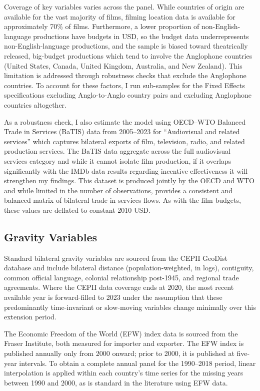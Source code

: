 Coverage of key variables varies across the panel. While countries of origin are available for the vast majority of films, filming location data is available for approximately 70\% of films. Furthermore, a lower proportion of non-English-language productions have budgets in USD, so the budget data underrepresents non-English-language productions, and the sample is biased toward theatrically released, big-budget productions which tend to involve the Anglophone countries (United States, Canada, United Kingdom, Australia, and New Zealand). This limitation is addressed through robustness checks that exclude the Anglophone countries. To account for these factors, I run sub-samples for the Fixed Effects specifications excluding Anglo-to-Anglo country pairs and excluding Anglophone countries altogether.

As a robustness check, I also estimate the model using OECD--WTO Balanced Trade in Services (BaTIS) data from 2005--2023 for ``Audiovisual and related services'' which captures bilateral exports of film, television, radio, and related production services. The BaTIS data aggregate across the full audiovisual services category and while it cannot isolate film production, if it overlaps significantly with the IMDb data results regarding incentive effectiveness it will strengthen my findings. This dataset is produced jointly by the OECD and WTO and while limited in the number of observations, provides a consistent and balanced matrix of bilateral trade in services flows. As with the film budgets, these values are deflated to constant 2010 USD.

\subsection{Gravity Variables}
\label{sec:data_gravity}

Standard bilateral gravity variables are sourced from the CEPII GeoDist database and include bilateral distance (population-weighted, in logs), contiguity, common official language, colonial relationship post-1945, and regional trade agreements. Where the CEPII data coverage ends at 2020, the most recent available year is forward-filled to 2023 under the assumption that these predominantly time-invariant or slow-moving variables change minimally over this extension period.

The Economic Freedom of the World (EFW) index data is sourced from the Fraser Institute, both measured for importer and exporter. The EFW index is published annually only from 2000 onward; prior to 2000, it is published at five-year intervals. To obtain a complete annual panel for the 1990--2018 period, linear interpolation is applied within each country's time series for the missing years between 1990 and 2000, as is standard in the literature using EFW data.

